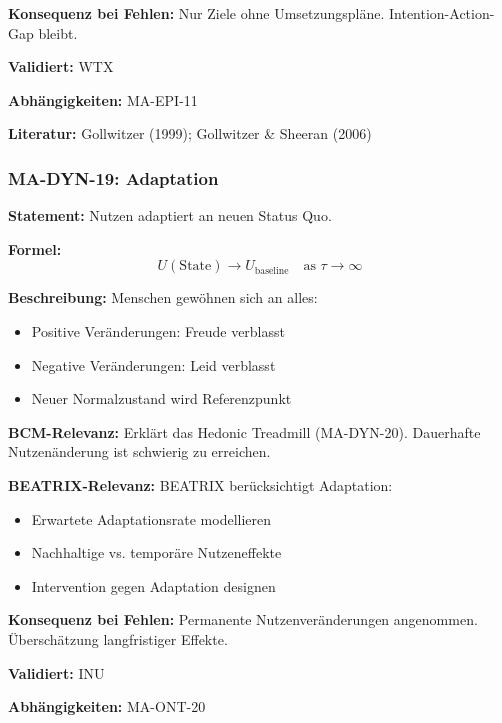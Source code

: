 \textbf{Konsequenz bei Fehlen:}
Nur Ziele ohne Umsetzungspläne. Intention-Action-Gap bleibt.

\textbf{Validiert:} WTX

\textbf{Abhängigkeiten:} MA-EPI-11

\textbf{Literatur:} Gollwitzer (1999); Gollwitzer \& Sheeran (2006)


\subsubsection*{MA-DYN-19: Adaptation}

\textbf{Statement:} Nutzen adaptiert an neuen Status Quo.

\textbf{Formel:}
\begin{equation}
U(\text{State}) \rightarrow U_{\text{baseline}} \quad \text{as } \tau \rightarrow \infty
\end{equation}

\textbf{Beschreibung:}
Menschen gewöhnen sich an alles:
\begin{itemize}
    \item Positive Veränderungen: Freude verblasst
    \item Negative Veränderungen: Leid verblasst
    \item Neuer Normalzustand wird Referenzpunkt
\end{itemize}

\textbf{BCM-Relevanz:}
Erklärt das Hedonic Treadmill (MA-DYN-20). Dauerhafte Nutzenänderung ist schwierig zu erreichen.

\textbf{BEATRIX-Relevanz:}
BEATRIX berücksichtigt Adaptation:
\begin{itemize}
    \item Erwartete Adaptationsrate modellieren
    \item Nachhaltige vs. temporäre Nutzeneffekte
    \item Intervention gegen Adaptation designen
\end{itemize}

\textbf{Konsequenz bei Fehlen:}
Permanente Nutzenveränderungen angenommen. Überschätzung langfristiger Effekte.

\textbf{Validiert:} INU

\textbf{Abhängigkeiten:} MA-ONT-20

